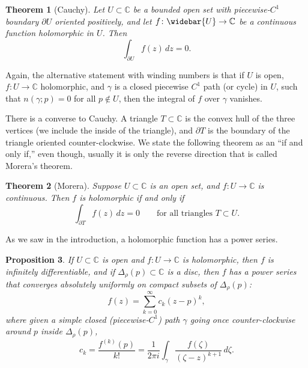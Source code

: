 \documentclass[12pt,openany]{book}
\newcommand{\C}{{\mathbb{C}}}
\theoremstyle{plain}
\newtheorem{thm}{Theorem}[section]
\newtheorem{prop}[thm]{Proposition}
\theoremstyle{remark}
\theoremstyle{definition}
\theoremstyle{exercise}
\theoremstyle{example}
\begin{document}
\begin{thm}[Cauchy]
Let $U \subset \C$ be a bounded open set with piecewise-$C^1$ boundary
$\partial U$ oriented positively, and let
$f \colon \widebar{U} \to \C$ be a continuous function
holomorphic in $U$.  Then
\begin{equation*}
\int_{\partial U}
f(z) \, dz = 0 .
\end{equation*}
\end{thm}

Again, the alternative statement with winding numbers
 is that if $U$ is open, $f \colon U \to \C$ holomorphic, and $\gamma$ is
a closed piecewise $C^1$ path (or cycle) in $U$, such that
$n(\gamma;p) = 0$ for all $p \not\in U$, then
the integral of $f$ over $\gamma$ vanishes.

There is a converse to Cauchy.  A triangle $T \subset \C$ is
the convex hull of the three vertices (we include the inside of the
triangle), and $\partial T$ is the boundary of the triangle oriented
counter-clockwise.  We state the following theorem as an
``if and only if,'' even though, usually it is only the reverse direction that
is called Morera's theorem.

\begin{thm}[Morera] \label{thm:onevarmorera}
Suppose $U \subset \C$ is an open set, and $f \colon U \to \C$
is continuous.  Then $f$ is holomorphic
if and only if
\begin{equation*}
\int_{\partial T} f(z) \, dz = 0
\qquad
\text{for all triangles } T \subset U.
\end{equation*}
\end{thm}

As we saw in the introduction, a holomorphic function has a power series.

\begin{prop}
If $U \subset \C$ is open and $f \colon U \to \C$ is holomorphic,
then $f$ is infinitely differentiable, and if $\Delta_\rho(p) \subset \C$
is a disc, then $f$ has a power series that
converges absolutely uniformly on compact subsets of $\Delta_\rho(p)$:
\begin{equation*}
f(z) = \sum_{k=0}^\infty c_k {(z-p)}^k ,
\end{equation*}
where given a simple closed (piecewise-$C^1$) path $\gamma$
going once counter-clockwise
around $p$ inside $\Delta_\rho(p)$,
\begin{equation*}
c_k = \frac{f^{(k)}(p)}{k!} =
\frac{1}{2\pi i}
\int_{\gamma}
\frac{f(\zeta)}{{(\zeta-z)}^{k+1}}
\,
d \zeta  .
\end{equation*}
\end{prop}
\end{document}
